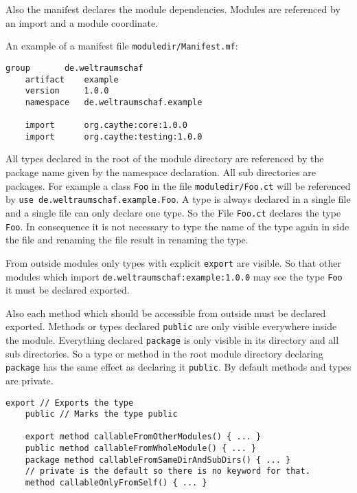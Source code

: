 \documentclass[11pt,a4paper]{report}
\begin{document}
Also the manifest declares the module dependencies. Modules are referenced by an import and a module coordinate.

An example of a manifest file \texttt{moduledir/Manifest.mf}:
\begin{lstlisting}[language=CayThe]
    group       de.weltraumschaf
    artifact    example
    version     1.0.0
    namespace   de.weltraumschaf.example

    import      org.caythe:core:1.0.0
    import      org.caythe:testing:1.0.0
\end{lstlisting}

All types declared in the root of the module directory are referenced by the package name given by the namespace declaration. All sub directories are packages. For example a class \texttt{Foo} in the file \texttt{moduledir/Foo.ct} will be referenced by \texttt{use de.weltraumschaf.example.Foo}. A type is always declared in a single file and a single file can only declare one type. So the File \texttt{Foo.ct} declares the type \texttt{Foo}. In consequence it is not necessary to type the name of the type again in side the file and renaming the file result in renaming the type.

From outside modules only types with explicit \texttt{export} are visible. So that other modules which import \texttt{de.weltraumschaf:example:1.0.0} may see the type \texttt{Foo} it must be declared exported.

Also each method which should be accessible from outside must be declared exported. Methods or types declared \texttt{public} are only visible everywhere inside the module. Everything declared \texttt{package} is only visible in its directory and all sub directories. So a type or method in the root module directory declaring \texttt{package} has the same effect as declaring it \texttt{public}. By default methods and types are private.

\begin{lstlisting}[language=CayThe]
    export // Exports the type
    public // Marks the type public

    export method callableFromOtherModules() { ... }
    public method callableFromWholeModule() { ... }
    package method callableFromSameDirAndSubDirs() { ... }
    // private is the default so there is no keyword for that.
    method callableOnlyFromSelf() { ... }
\end{lstlisting}

\end{document}

